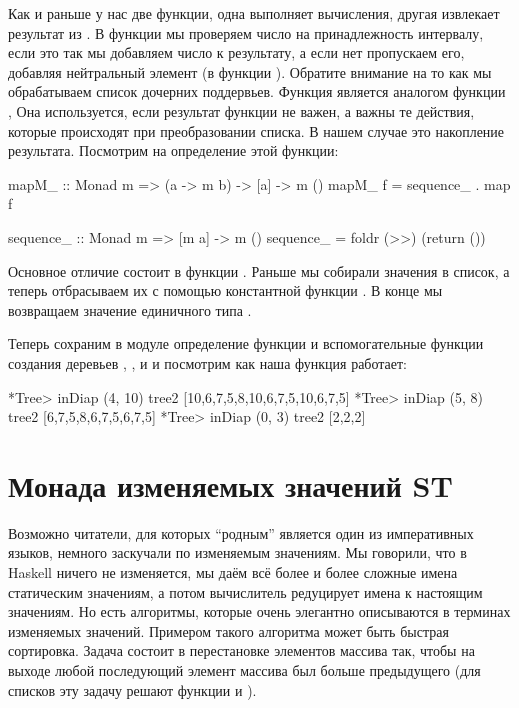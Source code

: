Как и раньше у нас две функции, одна выполняет вычисления, другая
извлекает результат из . В функции  мы проверяем
число на принадлежность интервалу, если это так мы добавляем число к
результату, а если нет пропускаем его, добавляя нейтральный элемент (в
функции ). Обратите внимание на то как мы обрабатываем список
дочерних поддервьев. Функция  является аналогом функции
, Она используется, если результат функции не важен, а важны те
действия, которые происходят при преобразовании списка. В нашем случае
это накопление результата. Посмотрим на определение этой функции:


\begin{code}
mapM_ :: Monad m => (a -> m b) ->  [a] -> m ()
mapM_ f = sequence_ . map f

sequence_ :: Monad m => [m a] -> m ()
sequence_ = foldr (>>) (return ())
\end{code}

Основное отличие состоит в функции . Раньше мы собирали
значения в список, а теперь отбрасываем их с помощью константной функции
\In{>>}. В конце мы возвращаем значение единичного типа \In{()}.

Теперь сохраним в модуле  определение функции и вспомогательные
функции создания деревьев , , и  и посмотрим как
наша функция работает:


\begin{code}
*Tree> inDiap (4, 10) tree2
[10,6,7,5,8,10,6,7,5,10,6,7,5]
*Tree> inDiap (5, 8) tree2
[6,7,5,8,6,7,5,6,7,5]
*Tree> inDiap (0, 3) tree2
[2,2,2]
\end{code}

\section{Монада изменяемых значений ST}

Возможно читатели, для которых ``родным'' является один из императивных
языков, немного заскучали по изменяемым значениям. Мы говорили, что в
Haskell ничего не изменяется, мы даём всё более и более сложные имена
статическим значениям, а потом вычислитель редуцирует имена к настоящим
значениям. Но есть алгоритмы, которые очень элегантно описываются в
терминах изменяемых значений. Примером такого алгоритма может быть
быстрая сортировка. Задача состоит в перестановке элементов массива так,
чтобы на выходе любой последующий элемент массива был больше предыдущего
(для списков эту задачу решают функции  и ).

